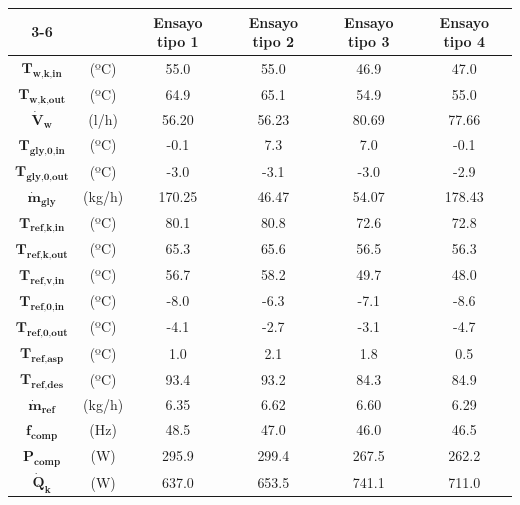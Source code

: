 \documentclass[../main.tex]{subfiles}
\begin{document}
\begin{table}[ht]
\centering
\begin{tabular}{cc|c|c|c|c|}
\cline{3-6}
 & & \textbf{Ensayo tipo 1} & \textbf{Ensayo tipo 2} & \textbf{Ensayo tipo 3} & \textbf{Ensayo tipo 4} \\
\hline
\multicolumn{1}{|c}{$\textbf{T}_\textbf{w,k,in}$} & (ºC) & 55.0 & 55.0 & 46.9 & 47.0 \\
\hline
\multicolumn{1}{|c}{$\textbf{T}_\textbf{w,k,out}$} & (ºC) & 64.9 & 65.1 & 54.9 & 55.0 \\
\hline
\multicolumn{1}{|c}{$\dot{\textbf{V}}_\textbf{w}$} & (l/h) & 56.20 & 56.23 & 80.69 & 77.66 \\
\hline
\multicolumn{1}{|c}{$\textbf{T}_\textbf{gly,0,in}$} & (ºC) & -0.1 & 7.3 & 7.0 & -0.1 \\
\hline
\multicolumn{1}{|c}{$\textbf{T}_\textbf{gly,0,out}$} & (ºC) & -3.0 & -3.1 & -3.0 & -2.9 \\
\hline
\multicolumn{1}{|c}{$\dot{\textbf{m}}_\textbf{gly}$} & (kg/h) & 170.25 & 46.47 & 54.07 & 178.43 \\
\hline
\multicolumn{1}{|c}{$\textbf{T}_\textbf{ref,k,in}$} & (ºC) & 80.1 & 80.8 & 72.6 & 72.8 \\
\hline
\multicolumn{1}{|c}{$\textbf{T}_\textbf{ref,k,out}$} & (ºC) & 65.3 & 65.6 & 56.5 & 56.3 \\
\hline
\multicolumn{1}{|c}{$\textbf{T}_\textbf{ref,v,in}$} & (ºC) & 56.7 & 58.2 & 49.7 & 48.0 \\
\hline
\multicolumn{1}{|c}{$\textbf{T}_\textbf{ref,0,in}$} & (ºC) & -8.0 & -6.3 & -7.1 & -8.6 \\
\hline
\multicolumn{1}{|c}{$\textbf{T}_\textbf{ref,0,out}$} & (ºC) & -4.1 & -2.7 & -3.1 & -4.7 \\
\hline
\multicolumn{1}{|c}{$\textbf{T}_\textbf{ref,asp}$} & (ºC) & 1.0 & 2.1 & 1.8 & 0.5 \\
\hline
\multicolumn{1}{|c}{$\textbf{T}_\textbf{ref,des}$} & (ºC) & 93.4 & 93.2 & 84.3 & 84.9 \\
\hline
\multicolumn{1}{|c}{$\dot{\textbf{m}}_\textbf{ref}$} & (kg/h) & 6.35 & 6.62 & 6.60 & 6.29 \\
\hline
\multicolumn{1}{|c}{$\textbf{f}_\textbf{comp}$} & (Hz) & 48.5 & 47.0 & 46.0 & 46.5 \\
\hline
\multicolumn{1}{|c}{$\textbf{P}_\textbf{comp}$} & (W) & 295.9 & 299.4 & 267.5 & 262.2 \\
\hline
\multicolumn{1}{|c}{$\dot{\textbf{Q}}_\textbf{k}$} & (W) & 637.0 & 653.5 & 741.1 & 711.0 \\

\end{tabular}
\end{table}
\end{document}
